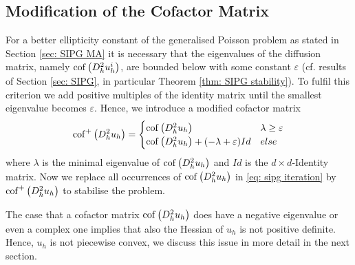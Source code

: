 \subsection{Modification of the Cofactor Matrix}\label{sec: mod cofactor}
For a better ellipticity constant of the generalised Poisson problem as stated in Section \ref{sec: SIPG MA} it is necessary that the eigenvalues of the diffusion matrix, namely $\operatorname{cof} \left( D_h^2 u_h^i \right)$, are bounded below with some constant $\varepsilon$ (cf. results of Section \ref{sec: SIPG}, in particular Theorem \ref{thm: SIPG stability}).
To fulfil this criterion we add positive multiples of the identity matrix until the smallest eigenvalue becomes $\varepsilon$. Hence, we introduce a modified cofactor matrix
\[ 
	\mycofMod {D^2_h u_h} = \begin{cases}
	\mycof {D^2_h u_h} & \lambda \geq \varepsilon	\\
	\mycof {D^2_h u_h}+ (-\lambda+\varepsilon) Id%
	& else
	\end{cases}
\]
where $\lambda$ is the minimal eigenvalue of $ \operatorname{cof} \left( D^2_h u_h \right)$ and $Id$ is the $d \times d$-Identity matrix. 
Now we replace all occurrences of $\operatorname{cof} \left( D^2_h u_h \right)$ in \eqref{eq: sipg iteration} by $\operatorname{cof}^+ \left( D^2_h u_h \right)$ to stabilise the problem.

The case that a cofactor matrix $\operatorname{cof} \left( D^2_h u_h \right) $ does have a negative eigenvalue or even a complex one implies that also the Hessian of $u_h$ is not positive definite. Hence, $u_h$ is not piecewise convex, we discuss this issue in more detail in the next section.


